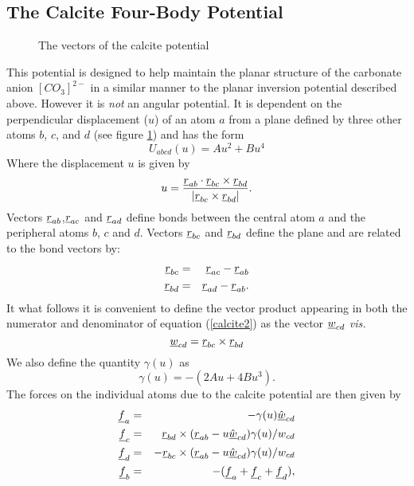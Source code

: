 \subsection{The Calcite Four-Body Potential}
\label{calcite}
\begin{figure}[ht]
\begin{center}
\centerline{}
\caption{The vectors of the calcite potential}
\label{calcfig}
\end{center}
\end{figure}
 This potential \cite{rohl-03a} is designed to help
maintain the planar structure of the carbonate anion $[CO_{3}]^{2-}$ in a
similar manner to the planar inversion potential described above. However it
is {\em not} an angular potential. It is dependent on the perpendicular
displacement ($u$) of an atom $a$ from a plane defined by three other atoms
$b$, $c$, and $d$ (see figure \ref{calcfig}) and has the form
\begin{equation}
U_{abcd}(u)=Au^{2}+Bu^{4} \label{calcite1}
\end{equation}
Where the displacement $u$ is given by
\begin{equation}
u=\frac{\mbox{$\underline{r}$}_{ab}\cdot\mbox{$\underline{r}$}_{bc}\times\mbox{$\underline{r}$}_{bd}}{|\mbox{$\underline{r}$}_{bc}\times\mbox{$\underline{r}$}_{bd}|}.\label{calcite2}
\end{equation}
Vectors $\mbox{$\underline{r}$}_{ab}$,$\mbox{$\underline{r}$}_{ac}$ and $\mbox{$\underline{r}$}_{ad}$ define bonds between
the central atom $a$ and the peripheral atoms $b$, $c$ and $d$. Vectors
$\mbox{$\underline{r}$}_{bc}$ and $\mbox{$\underline{r}$}_{bd}$ define the plane and are related to the bond
vectors by:
\begin{eqnarray}
\mbox{$\underline{r}$}_{bc}&=&\mbox{$\underline{r}$}_{ac}-\mbox{$\underline{r}$}_{ab} \nonumber \\
\mbox{$\underline{r}$}_{bd}&=&\mbox{$\underline{r}$}_{ad}-\mbox{$\underline{r}$}_{ab}.
\end{eqnarray}
It what follows it is convenient to define the vector product appearing in
both the numerator and denominator of equation (\ref{calcite2}) as the vector
$\mbox{$\underline{w}$}_{cd}$ {\em vis.}
\begin{equation}
\mbox{$\underline{w}$}_{cd}=\mbox{$\underline{r}$}_{bc}\times\mbox{$\underline{r}$}_{bd}
\end{equation}
We also define the quantity $\gamma(u)$ as
\begin{equation}
\gamma(u)=-(2Au+4Bu^{3}).
\end{equation}
The forces on the individual atoms due to the calcite potential are then given
by 
\begin{eqnarray}
\mbox{$\underline{f}$}_{a}&=&-\gamma(u)\hat{\mbox{$\underline{w}$}}_{cd} \nonumber \\
\mbox{$\underline{f}$}_{c}&=&\phantom{+}\mbox{$\underline{r}$}_{bd}\times(\mbox{$\underline{r}$}_{ab}-
u\hat{\mbox{$\underline{w}$}}_{cd})\gamma(u)/w_{cd} \nonumber \\
\mbox{$\underline{f}$}_{d}&=&-\mbox{$\underline{r}$}_{bc}\times(\mbox{$\underline{r}$}_{ab}-
u\hat{\mbox{$\underline{w}$}}_{cd})\gamma(u)/w_{cd} \nonumber \\
\mbox{$\underline{f}$}_{b}&=&-(\mbox{$\underline{f}$}_{a}+\mbox{$\underline{f}$}_{c}+\mbox{$\underline{f}$}_{d}),
\end{eqnarray}
